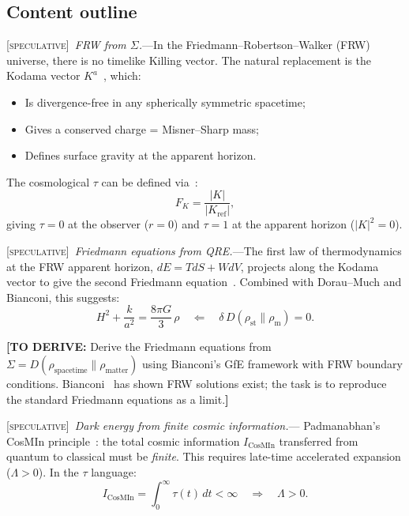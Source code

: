 \documentclass[prl,twocolumn,superscriptaddress,longbibliography,floatfix]{revtex4-2}
\newcommand{\tauasym}{\tau}
\newcommand{\spec}{\textsc{[speculative]}}
\newcommand{\toderive}[1]{{\color{red}\textbf{[TO DERIVE:} #1\textbf{]}}}
\begin{document}
\subsection*{Content outline}

\spec\ \emph{FRW from $\Sigma$.}---In the Friedmann--Robertson--Walker
(FRW) universe, there is no timelike Killing vector. The natural
replacement is the Kodama vector $K^a$~\cite{Kodama1980}, which:
\begin{itemize}
\item Is divergence-free in any spherically symmetric spacetime;
\item Gives a conserved charge = Misner--Sharp mass;
\item Defines surface gravity at the apparent horizon.
\end{itemize}

The cosmological $\tauasym$ can be defined via~\cite{Paper3cosmological}:
\begin{equation}
F_K = \frac{|K|}{|K_{\mathrm{ref}}|},
\label{eq:F_kodama}
\end{equation}
giving $\tauasym = 0$ at the observer ($r = 0$) and
$\tauasym = 1$ at the apparent horizon ($|K|^2 = 0$).

\spec\ \emph{Friedmann equations from QRE.}---The first law of
thermodynamics at the FRW apparent horizon,
$dE = TdS + WdV$, projects along the Kodama vector to give the
second Friedmann equation~\cite{Hayward1998,CaiKim2005}.
Combined with Dorau--Much and Bianconi, this suggests:
\begin{equation}
H^2 + \frac{k}{a^2} = \frac{8\pi G}{3}\,\rho
\quad \Leftarrow \quad
\delta\, D(\rho_{\mathrm{st}} \| \rho_{\mathrm{m}}) = 0.
\label{eq:friedmann_from_qre}
\end{equation}

\toderive{Derive the Friedmann equations from
$\Sigma = D(\rho_{\mathrm{spacetime}} \| \rho_{\mathrm{matter}})$
using Bianconi's GfE framework with FRW boundary conditions.
Bianconi~\cite{BianconiCosmology2025} has shown FRW solutions
exist; the task is to reproduce the standard Friedmann equations
as a limit.}

\spec\ \emph{Dark energy from finite cosmic information.}---
Padmanabhan's CosMIn principle~\cite{Padmanabhan2017}: the total
cosmic information $I_{\mathrm{CosMIn}}$ transferred from
quantum to classical must be \emph{finite}. This requires
late-time accelerated expansion ($\Lambda > 0$). In the
$\tauasym$ language:
\begin{equation}
I_{\mathrm{CosMIn}} = \int_0^\infty \tauasym(t)\, dt < \infty
\quad \Rightarrow \quad \Lambda > 0.
\label{eq:cosmin_tau}
\end{equation}
\end{document}
